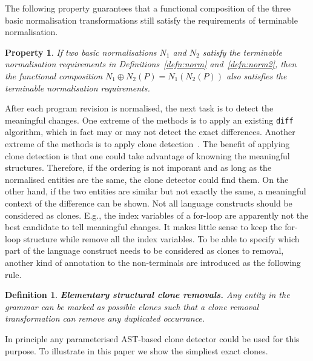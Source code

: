 \documentclass[10pt, conference, compsocconf]{IEEEtran}
\newtheorem{property}{Property}
\newtheorem{definition}{Definition}
\begin{document}
The following property guarantees that a functional composition of the three basic normalisation transformations still satisfy the requirements of terminable normalisation.
\begin{property}
If two basic normalisations $N_1$ and $N_2$ satisfy the terminable normalisation requirements in Definitions~\ref{defn:norm} and~\ref{defn:norm2}, then the functional composition $N_1 \oplus N_2 (P) = N_1 (N_2(P))$ also satisfies the terminable normalisation requirements.
\end{property}

After each program revision is normalised, the next task is to detect the meaningful changes. One extreme of  the methods is to apply an existing {\tt diff} algorithm, which in fact may or may not detect the exact differences.  Another extreme of the methods is to apply clone detection~\cite{NiCAD}. The benefit of applying clone detection is that one could take advantage of knowning the meaningful structures. Therefore, if the ordering is not imporant and as long as the normalised entities are the same, the clone detector could find them. On  the other hand, if the two entities are similar but not exactly the same, a meaningful context of the difference can be shown.
Not all language constructs should be considered as clones. E.g., the index variables of a for-loop are apparently not the best candidate to tell meaningful changes. It makes little sense to keep the for-loop structure while remove all the index variables.
To be able to specify which part of the language construct needs to be considered as clones to removal, another kind of annotation to the non-terminals are introduced as the following rule. 

\begin{definition}
{\bf Elementary structural clone removals.\label{defn:norm5}} Any entity in the grammar can be marked as possible clones such that a clone removal transformation can remove any duplicated occurrance. 
\end{definition}

In principle any parameterised AST-based clone detector could be used for this purpose. To illustrate in this paper we show the simpliest exact clones.
\end{document}
